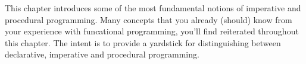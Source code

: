 This chapter introduces some of the most fundamental notions of imperative and
procedural programming.  Many concepts that you already (should) know from your
experience with funcational programming, you'll find reiterated throughout this
chapter.  The intent is to provide a yardstick for distinguishing between
declarative, imperative and procedural programming.
